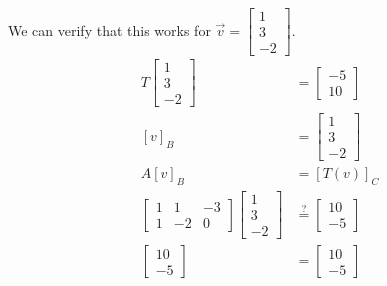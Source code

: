\documentclass{math}
\begin{document}
We can verify that this works for \( \vec{v} = \begin{bmatrix}1 \\ 3 \\ -2
\end{bmatrix} \).
\begin{align*}
  T\begin{bmatrix}1 \\ 3 \\ -2\end{bmatrix} &=
    \begin{bmatrix}-5 \\ 10\end{bmatrix} \\
  [v]_B &= \begin{bmatrix}1 \\ 3 \\ -2\end{bmatrix} \\
  A[v]_B &= [T(v)]_C \\
  \begin{bmatrix}
    1 & 1 & -3 \\
    1 & -2 & 0
  \end{bmatrix}\begin{bmatrix}1 \\ 3 \\ -2\end{bmatrix} &\stackrel{?}=
    \begin{bmatrix}10 \\ -5\end{bmatrix} \\
  \begin{bmatrix}10 \\ -5\end{bmatrix} &= \begin{bmatrix}10 \\ -5\end{bmatrix}
\end{align*}
\end{document}
